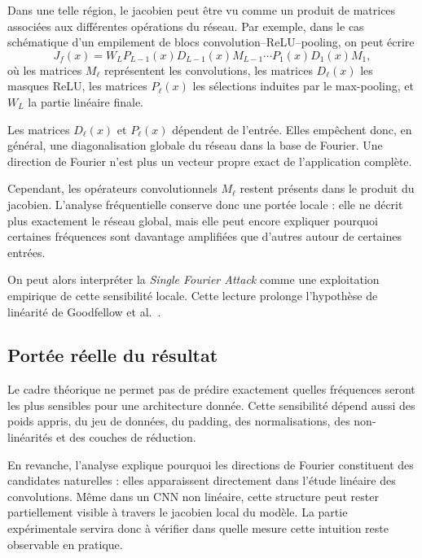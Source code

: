 Dans une telle région, le jacobien peut être vu comme un produit de matrices associées aux
différentes opérations du réseau. Par exemple, dans le cas schématique d'un empilement de blocs
convolution--ReLU--pooling, on peut écrire
\[
    J_f(x)
    =
    W_L P_{L-1}(x)D_{L-1}(x)M_{L-1}
    \cdots
    P_1(x)D_1(x)M_1,
\]
où les matrices $M_\ell$ représentent les convolutions, les matrices $D_\ell(x)$ les masques
ReLU, les matrices $P_\ell(x)$ les sélections induites par le max-pooling, et $W_L$ la partie
linéaire finale.

Les matrices $D_\ell(x)$ et $P_\ell(x)$ dépendent de l'entrée. Elles empêchent donc, en général,
une diagonalisation globale du réseau dans la base de Fourier. Une direction de Fourier n'est
plus un vecteur propre exact de l'application complète.

Cependant, les opérateurs convolutionnels $M_\ell$ restent présents dans le produit du
jacobien. L'analyse fréquentielle conserve donc une portée locale : elle ne décrit plus exactement
le réseau global, mais elle peut encore expliquer pourquoi certaines fréquences sont davantage
amplifiées que d'autres autour de certaines entrées.

On peut alors interpréter la \textit{Single Fourier Attack} comme une exploitation empirique de
cette sensibilité locale. Cette lecture prolonge l'hypothèse de linéarité de Goodfellow et
al.~\cite{goodfellow2015explaining}.

\subsection{Portée réelle du résultat}

Le cadre théorique ne permet pas de prédire exactement quelles fréquences seront les plus
sensibles pour une architecture donnée. Cette sensibilité dépend aussi des poids appris, du jeu
de données, du padding, des normalisations, des non-linéarités et des couches de réduction.

En revanche, l'analyse explique pourquoi les directions de Fourier constituent des candidates
naturelles : elles apparaissent directement dans l'étude linéaire des convolutions. Même dans un
CNN non linéaire, cette structure peut rester partiellement visible à travers le jacobien local du
modèle. La partie expérimentale servira donc à vérifier dans quelle mesure cette intuition reste
observable en pratique.


